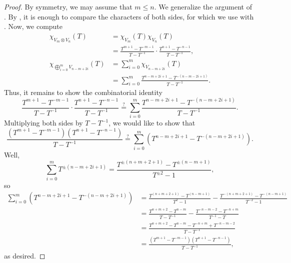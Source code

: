 \documentclass[../notes.tex]{subfiles}
\begin{document}
\begin{proof}
	By symmetry, we may assume that $m\le n$. We generalize the argument of . By , it is enough to compare the characters of both sides, for which we use  with . Now, we compute
	\begin{align*}
		\chi_{V_m\otimes V_n}(T) &= \chi_{V_m}(T)\chi_{V_n}(T) \\
		&= \frac{T^{m+1}-T^{-m-1}}{T-T^{-1}}\cdot\frac{T^{n+1}-T^{-n-1}}{T-T^{-1}}, \\
		\chi_{\bigoplus_{i=0}^{m}V_{n-m+2i}}(T) &= \sum_{i=0}^m\chi_{V_{n-m+2i}}(T) \\
		&= \sum_{i=0}^m\frac{T^{n-m+2i+1}-T^{-(n-m-2i+1)}}{T-T^{-1}}.
	\end{align*}
	Thus, it remains to show the combinatorial identity
	\[\frac{T^{m+1}-T^{-m-1}}{T-T^{-1}}\cdot\frac{T^{n+1}-T^{-n-1}}{T-T^{-1}}\stackrel?=\sum_{i=0}^m\frac{T^{n-m+2i+1}-T^{-(n-m+2i+1)}}{T-T^{-1}}.\]
	Multiplying both sides by $T-T^{-1}$, we would like to show that
	\[\frac{\left(T^{m+1}-T^{-m-1}\right)\left(T^{n+1}-T^{-n-1}\right)}{T-T^{-1}}\stackrel?=\sum_{i=0}^m\left(T^{n-m+2i+1}-T^{-(n-m+2i+1)}\right).\]
	Well,
	\[\sum_{i=0}^mT^{\pm\left(n-m+2i+1\right)}=\frac{T^{\pm(n+m+2+1)}-T^{\pm(n-m+1)}}{T^{\pm2}-1},\]
	so
	\begin{align*}
		\sum_{i=0}^m\left(T^{n-m+2i+1}-T^{-(n-m+2i+1)}\right) &= \frac{T^{(n+m+2+1)}-T^{(n-m+1)}}{T^{2}-1}-\frac{T^{-(n+m+2+1)}-T^{-(n-m+1)}}{T^{-2}-1} \\
		&= \frac{T^{n+m+2}-T^{n-m}}{T-T^{-1}}-\frac{T^{-n-m-2}-T^{-n+m}}{T^{-1}-T} \\
		&= \frac{T^{n+m+2}-T^{n-m}-T^{-n+m}+T^{-n-m-2}}{T-T^{-1}} \\
		&= \frac{\left(T^{m+1}-T^{-m-1}\right)\left(T^{n+1}-T^{-n-1}\right)}{T-T^{-1}},
	\end{align*}
	as desired.
\end{proof}
\end{document}
